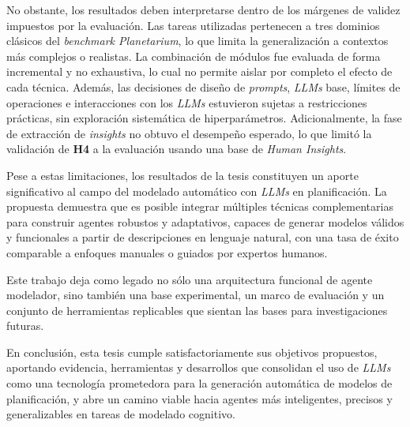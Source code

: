 \begin{conclusions}
No obstante, los resultados deben interpretarse dentro de los márgenes de validez impuestos por la evaluación. Las tareas utilizadas pertenecen a tres dominios clásicos del \textit{benchmark Planetarium}, lo que limita la generalización a contextos más complejos o realistas. La combinación de módulos fue evaluada de forma incremental y no exhaustiva, lo cual no permite aislar por completo el efecto de cada técnica. Además, las decisiones de diseño de \textit{prompts}, \textit{LLMs} base, límites de operaciones e interacciones con los \textit{LLMs} estuvieron sujetas a restricciones prácticas, sin exploración sistemática de hiperparámetros. Adicionalmente, la fase de extracción de \textit{insights} no obtuvo el desempeño esperado, lo que limitó la validación de \textbf{H4} a la evaluación usando una base de \textit{Human Insights}.

Pese a estas limitaciones, los resultados de la tesis constituyen un aporte significativo al campo del modelado automático con \textit{LLMs} en planificación. La propuesta demuestra que es posible integrar múltiples técnicas complementarias para construir agentes robustos y adaptativos, capaces de generar modelos válidos y funcionales a partir de descripciones en lenguaje natural, con una tasa de éxito comparable a enfoques manuales o guiados por expertos humanos.

Este trabajo deja como legado no sólo una arquitectura funcional de agente modelador, sino también una base experimental, un marco de evaluación y un conjunto de herramientas replicables que sientan las bases para investigaciones futuras. 

En conclusión, esta tesis cumple satisfactoriamente sus objetivos propuestos, aportando evidencia, herramientas y desarrollos que consolidan el uso de \textit{LLMs} como una tecnología prometedora para la generación automática de modelos de planificación, y abre un camino viable hacia agentes más inteligentes, precisos y generalizables en tareas de modelado cognitivo.
\end{conclusions}
